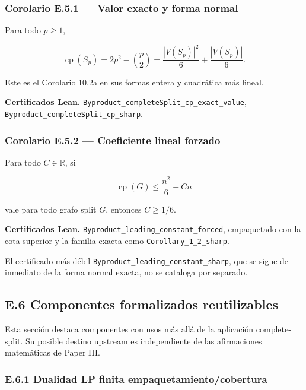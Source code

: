 \documentclass[
  spanish,
  11pt,
  a4paper,
]{article}
\begin{document}
\subsubsection{Corolario E.5.1 --- Valor exacto y forma normal}\label{corolario-e.5.1-valor-exacto-y-forma-normal}

Para todo \(p\ge1\),

\[\operatorname{cp}(S_p)=2p^2-\binom p2=\frac{|V(S_p)|^2}{6}+\frac{|V(S_p)|}{6}.\]

Este es el Corolario 10.2a en sus formas entera y cuadrática más lineal.

\textbf{Certificados Lean.} \texttt{Byproduct\_completeSplit\_cp\_exact\_value}, \texttt{Byproduct\_completeSplit\_cp\_sharp}.

\subsubsection{Corolario E.5.2 --- Coeficiente lineal forzado}\label{corolario-e.5.2-coeficiente-lineal-forzado}

Para todo \(C\in\mathbb R\), si

\[\operatorname{cp}(G)\le \frac{n^2}{6}+Cn\]

vale para todo grafo split \(G\), entonces \(C\ge1/6\).

\textbf{Certificados Lean.} \texttt{Byproduct\_leading\_constant\_forced}, empaquetado con la cota superior y la familia exacta como \texttt{Corollary\_1\_2\_sharp}.

El certificado más débil \texttt{Byproduct\_leading\_constant\_sharp}, que se sigue de inmediato de la forma normal exacta, no se cataloga por separado.

\subsection{E.6 Componentes formalizados reutilizables}\label{e.6-componentes-formalizados-reutilizables}

Esta sección destaca componentes con usos más allá de la aplicación complete-split. Su posible destino upstream es independiente de las afirmaciones matemáticas de Paper III.

\subsubsection{E.6.1 Dualidad LP finita empaquetamiento/cobertura}\label{e.6.1-dualidad-lp-finita-empaquetamientocobertura}
\end{document}
